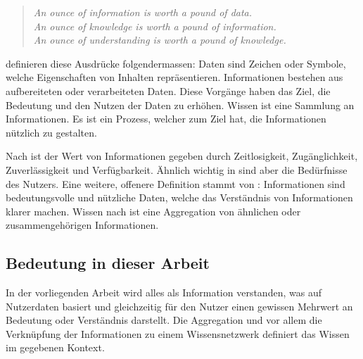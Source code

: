 \begin{quote}\label{wissen-zitat}
\textit{An ounce of information is worth a pound of data.}\\
\textit{An ounce of knowledge is worth a pound of information.}\\
\textit{An ounce of understanding is worth a pound of knowledge.}\\
\end{quote}

 \cite{bellinger2004data} definieren diese Ausdrücke folgendermassen:
 Daten sind Zeichen oder Symbole, welche Eigenschaften von Inhalten repräsentieren. Informationen bestehen aus aufbereiteten oder verarbeiteten Daten. Diese Vorgänge haben das Ziel, die Bedeutung und den Nutzen der Daten zu erhöhen. Wissen ist eine Sammlung an Informationen. Es ist ein Prozess, welcher zum Ziel hat, die Informationen nützlich zu gestalten.
 
 Nach \cite{chen2005information} ist der Wert von Informationen gegeben durch Zeitlosigkeit, Zugänglichkeit, Zuverlässigkeit und Verfügbarkeit. Ähnlich wichtig in \cite{choo1996knowing} sind aber die Bedürfnisse des Nutzers. Eine weitere, offenere Definition stammt von \cite{bierly2000organizational}: Informationen sind bedeutungsvolle und nützliche Daten, welche das Verständnis von Informationen klarer machen. Wissen nach \cite{barlas2005self} ist eine Aggregation von ähnlichen oder zusammengehörigen Informationen. 


\subsection{Bedeutung in dieser Arbeit}




In der vorliegenden Arbeit wird alles als Information verstanden, was auf Nutzerdaten basiert und gleichzeitig für den Nutzer einen gewissen Mehrwert an Bedeutung oder Verständnis darstellt. Die Aggregation und vor allem die Verknüpfung der Informationen zu einem Wissensnetzwerk definiert das Wissen im gegebenen Kontext.

